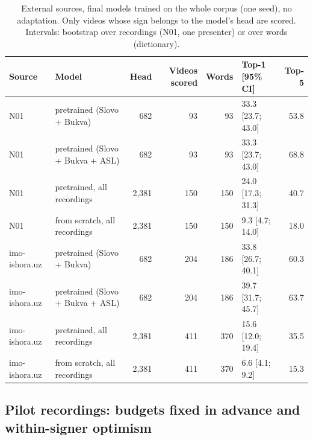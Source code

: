 \documentclass[a4paper,fleqn]{cas-dc}
\begin{document}
\begin{table}[t]
\caption{External sources, final models trained on the whole corpus (one seed), no adaptation. Only videos whose sign belongs to the model's head are scored. Intervals: bootstrap over recordings (N01, one presenter) or over words (dictionary).}\label{tab:external}
\footnotesize
\centering
\begin{tabular}{llrrrlr}
\toprule
\textbf{Source} & \textbf{Model} & \textbf{Head} & \textbf{Videos scored} & \textbf{Words} & \textbf{Top-1 [95\% CI]} & \textbf{Top-5} \\
\midrule
N01 & pretrained (Slovo + Bukva) & 682 & 93 & 93 & 33.3 [23.7; 43.0] & 53.8 \\
N01 & pretrained (Slovo + Bukva + ASL) & 682 & 93 & 93 & 33.3 [23.7; 43.0] & 68.8 \\
N01 & pretrained, all recordings & 2,381 & 150 & 150 & 24.0 [17.3; 31.3] & 40.7 \\
N01 & from scratch, all recordings & 2,381 & 150 & 150 & 9.3 [4.7; 14.0] & 18.0 \\
imo-ishora.uz & pretrained (Slovo + Bukva) & 682 & 204 & 186 & 33.8 [26.7; 40.1] & 60.3 \\
imo-ishora.uz & pretrained (Slovo + Bukva + ASL) & 682 & 204 & 186 & 39.7 [31.7; 45.7] & 63.7 \\
imo-ishora.uz & pretrained, all recordings & 2,381 & 411 & 370 & 15.6 [12.0; 19.4] & 35.5 \\
imo-ishora.uz & from scratch, all recordings & 2,381 & 411 & 370 & 6.6 [4.1; 9.2] & 15.3 \\
\bottomrule
\end{tabular}
\end{table}

\hypertarget{pilot-recordings-budgets-fixed-in-advance-and-within-signer-optimism}{%
\subsection{Pilot recordings: budgets fixed in advance and within-signer optimism}\label{pilot-recordings-budgets-fixed-in-advance-and-within-signer-optimism}}
\end{document}

